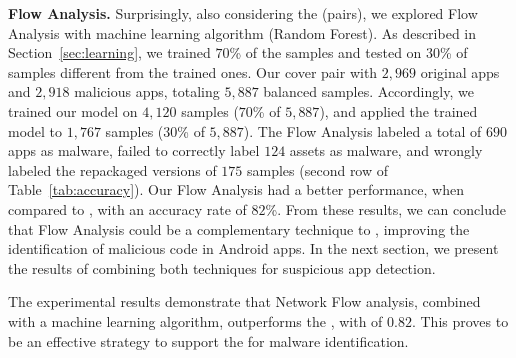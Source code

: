 {\bf Flow Analysis.} Surprisingly, also considering the \cds (\apps pairs), we explored Flow Analysis with machine learning algorithm (Random Forest). As described in Section~\ref{sec:learning}, we trained $70$\% of the samples and tested on $30$\% of samples different from the trained ones. Our \cds cover \apps pair with $2,969$ original apps and $2,918$ malicious apps, totaling $5,887$ balanced samples. Accordingly, we trained our model on $4,120$ samples ($70$\% of $5,887$), and applied the trained model to $1,767$ samples ($30$\% of $5,887$). The Flow Analysis labeled a total of $690$ apps as malware, failed to correctly label $124$ assets as malware, and wrongly labeled the repackaged versions of $175$ samples (second row of Table~\ref{tab:accuracy}). Our Flow Analysis had a better performance, when compared to \mas, with an accuracy rate of $82$\%. From these results, we can conclude that Flow Analysis could be a complementary technique to \mas, improving the identification of malicious code in Android apps. In the next section, we present the results of combining both techniques for suspicious app detection.

\begin{finding}
The experimental results demonstrate that Network Flow analysis, combined with a machine learning algorithm, outperforms the \mas, with \fone of $0.82$. This proves to be an effective strategy to support the \mas for malware identification.
\end{finding}


\begin{table}[h]
  \caption{Accuracy of both strategy on \cds.}
  \label{tab:accuracy}
\end{table}


